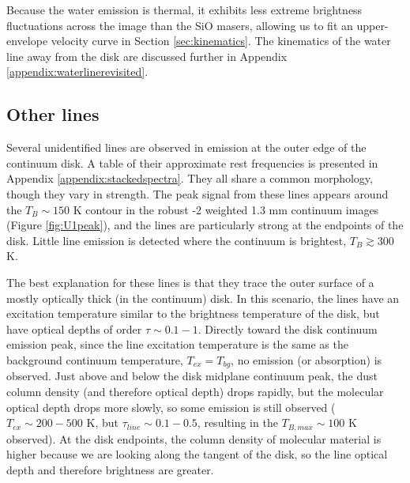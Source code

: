 \documentclass[twocolumn]{aastex62}
\begin{document}

Because the water emission is thermal, it exhibits less extreme
brightness fluctuations across the image than the SiO masers, allowing us to
fit an upper-envelope velocity curve in Section \ref{sec:kinematics}.
The kinematics of the water line away from the disk are discussed
further in Appendix \ref{appendix:waterlinerevisited}.



\subsection{Other lines}
\label{sec:otherlines}
Several unidentified lines are observed in  emission at the outer edge of the
continuum disk.  A table of their approximate rest frequencies is presented
in Appendix \ref{appendix:stackedspectra}.  They all share a common morphology,
though they vary in strength.  The peak signal from these lines appears around
the $T_B\sim150$ K contour in the robust -2 weighted 1.3 mm continuum images
(Figure \ref{fig:U1peak}), and the lines are particularly strong at the
endpoints of the disk.  Little line emission is detected where the continuum is
brightest, $T_B\gtrsim300$ K.

The best explanation for these lines is that they trace the outer surface of a
mostly optically thick (in the continuum) disk.  In this scenario, the lines
have an excitation temperature similar to the brightness temperature of the
disk, but have optical depths of order $\tau\sim0.1-1$.  Directly toward the
disk continuum emission peak, since the line excitation temperature is the same
as the background continuum temperature, $T_{ex}=T_{bg}$, no emission (or
absorption) is observed.  Just above and below the disk midplane continuum
peak, the dust column density (and therefore optical depth) drops rapidly, but
the molecular optical depth drops more slowly, so some emission is still
observed ($T_{ex}\sim200-500$ K, but $\tau_{line}\sim0.1-0.5$, resulting in the
$T_{B,max} \sim 100$ K observed).  At the disk endpoints, the column density of
molecular material is higher because we are looking along the tangent of the
disk, so the line optical depth and therefore brightness are greater.
\end{document}
